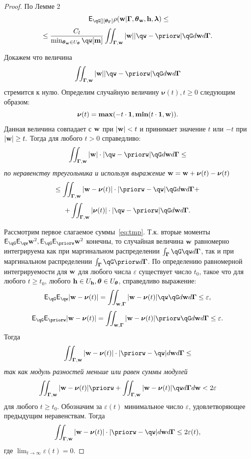 \begin{proof}

По Лемме 2
\[
    \E_{\qG[][{\tetaG}]} {\rho}(\w|\G, {\tetaw}, {\h}, \lam)  \leq
\]
\[
\leq  \frac{C_l}{\min_{\tetaw \in \Uteta} \qw[\mathbf{m}]}  \iint_{\G,\w} |\w| |\qw - \priorw|\qG d\w d\G.
\]

Докажем что величина
\[
    \iint_{\G,\w} |\w| |\qw - \priorw|\qG d\w d\G
\]
стремится к нулю.
Определим случайную величину $\boldsymbol{\nu}(t), t \geq 0$ следующим образом:
\[
    \boldsymbol{\nu}(t) = \boldsymbol{\max}(-t \cdot \mathbf{1}, \boldsymbol{\min}(t \cdot \mathbf{1}, \mathbf{w})).
\]
Данная величина совпадает с $\mathbf{w}$ при $|\mathbf{w}| < t$ и принимает значение $t$ или $-t$ при $|\mathbf{w}| \geq t.$
Тогда для любого $t>0$ справедливо:
\[
    \iint_{\G,\w} |\w| \cdot |\qw - \priorw|\qG d\w d\G \leq
\]
\textit{по неравенству треугольника и используя выражение }$\mathbf{w} = \mathbf{w} + \boldsymbol{\nu}(t) -\boldsymbol{\nu}(t)$
\begin{equation}
\label{eq:tmp}
    \leq    \iint_{\G,\w} |\w -\boldsymbol{\nu}(t)| \cdot |\priorw -\qw|\qG d\w d\G   +
\end{equation}
\[ +      \iint_{\G,\w} |\boldsymbol{\nu}(t)| \cdot |\qw - \priorw|\qG d\w d\G.
\]




Рассмотрим первое слагаемое суммы~\eqref{eq:tmp}. Т.к. вторые моменты $\E_{\qG}\E_{\qw} \w^2, \E_{\qG}\E_{\priorw} \w^2$ конечны, то случайная величина $\mathbf{w}$ равномерно интегрируема как при маргинальном распределении $\int_{\G}\qG\qw d\G$, так и при маргинальном распределении $\int_{\G}\qG\priorw d\G$.
По определению равномерной интегрируемости для $\mathbf{w}$ для любого числа $\varepsilon$ существует число $t_0$, такое что для любого $t \geq t_0$, любого $\mathbf{h} \in U_{\mathbf{h}}, \boldsymbol{\theta} \in U_{\boldsymbol{\theta}}$,  справедливо выражение:
\[
    \E_{\qG}\E_{\qw}|\w - \boldsymbol{\nu}(t)| = \iint_{\w,\G}|\w - \boldsymbol{\nu}(t)|\qw\qG d\w d\G \leq \varepsilon,
\]
\[
    \E_{\qG}\E_{\priorw}|\w - \boldsymbol{\nu}(t)| = \iint_{\w,\G}|\w - \boldsymbol{\nu}(t)|\priorw\qG d\w d\G \leq \varepsilon.
\]
Тогда
\[
   \iint_{\G,\w} |\w -\boldsymbol{\nu}(t)|\cdot|\priorw  - \qw| d\w d\G   \leq  
\]
\textit{так как модуль разностей меньше или равен суммы модулей}
\[
  \iint_{\G,\w} |\w -\boldsymbol{\nu}(t)|\priorw  +   \iint_{\G,\w} |\w -\boldsymbol{\nu}(t)|\qw d\G d\w < 2 \varepsilon
\]
для любого $t \geq t_0$. Обозначим за $\varepsilon(t)$ минимальное число $\varepsilon$, удовлетворяющее предыдущим неравенствам. Тогда
$$
 \iint_{\G,\w} |\w -\boldsymbol{\nu}(t)|\cdot|\priorw  - \qw| d\w d\G  \leq 2 \varepsilon(t),
$$
где $\lim_{t \to \infty} \varepsilon(t) = 0$.


\end{proof}
